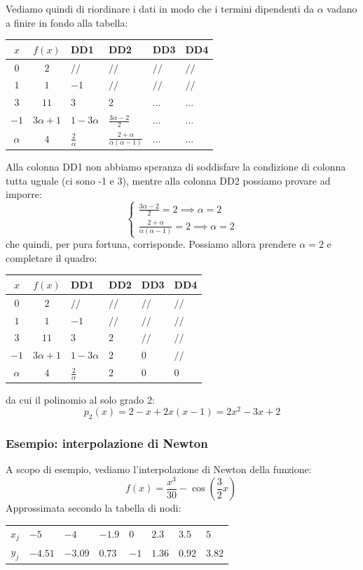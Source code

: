 \documentclass[a4paper,11pt]{article}
\begin{document}
Vediamo quindi di riordinare i dati in modo che i termini dipendenti da $\alpha$ vadano a finire in fondo alla tabella:
\begin{table}[H]
	\center 
	\begin{tabular} { c | c | p{1cm} p{1cm} p{1cm} p{1cm} }
		$x$ & $f(x)$ & DD1 & DD2 & DD3 & DD4\\
		\hline
		$0 $ & $ 2 $ & $ // $ & $ // $ & $ // $ & $ // $ \\
		$1 $ & $ 1 $ & $ -1 $ & $ // $ & $ // $ & $ // $ \\
		$3 $ & $ 11 $ & $ 3 $ & $ 2 $ & $ ...$ & $...$ \\
		$-1$ & $3 \alpha + 1$ & $1 - 3 \alpha$ & $\frac{3 \alpha - 2}{2}$ & $...$ & $...$ \\
		$\alpha$ & $4$ & $\frac{2}{\alpha}$ & $\frac{2 + \alpha}{\alpha(\alpha - 1)}$ & $...$ & $...$
	\end{tabular}
\end{table}

Alla colonna DD1 non abbiamo speranza di soddisfare la condizione di colonna tutta uguale (ci sono -1 e 3), mentre alla colonna DD2 possiamo provare ad imporre:
\[
	\begin{cases}
		\frac{3 \alpha - 2}{2} = 2 \implies \alpha = 2 \\
		\frac{2 + \alpha}{\alpha(\alpha - 1)} = 2 \implies \alpha = 2
	\end{cases}
\]
che quindi, per pura fortuna, corrisponde.
Possiamo allora prendere $\alpha = 2$ e completare il quadro:
\begin{table}[H]
	\center 
	\begin{tabular} { c | c | p{1cm} p{1cm} p{1cm} p{1cm} }
		$x$ & $f(x)$ & DD1 & DD2 & DD3 & DD4\\
		\hline
		$0 $ & $ 2 $ & $ // $ & $ // $ & $ // $ & $ // $ \\
		$1 $ & $ 1 $ & $ -1 $ & $ // $ & $ // $ & $ // $ \\
		$3 $ & $ 11 $ & $ 3 $ & $ 2 $ & $ // $ & $ // $ \\
		$-1$ & $3 \alpha + 1$ & $1 - 3 \alpha$ & $2$ & $0$ & $ // $ \\
		$\alpha$ & $4$ & $\frac{2}{\alpha}$ & $2$ & $0$ & $0$
	\end{tabular}
\end{table}
da cui il polinomio al solo grado 2:
$$
p_2(x) = 2 - x + 2x(x - 1) = 2x^2 - 3x + 2
$$

\subsubsection{Esempio: interpolazione di Newton}
A scopo di esempio, vediamo l'interpolazione di Newton della funzione:
$$
f\left(x\right)=\frac{x^{3}}{30}-\cos\left(\frac{3}{2}x\right)\ 
$$
Approssimata secondo la tabella di nodi:
\begin{table}[H]
	\center
	\begin{tabular} { c | p{1cm} p{1cm} p{1cm} p{1cm} p{1cm} p{1cm} p{1cm} }
		$x_j$ & $-5$ & $-4$ & $-1.9$ & $0$ & $2.3$ & $3.5$ & $5$ \\
		$y_j$ & $-4.51$ & $-3.09$ & $0.73$ & $-1$ & $1.36$ & $0.92$ & $3.82$
	\end{tabular}
\end{table}
\end{document}
